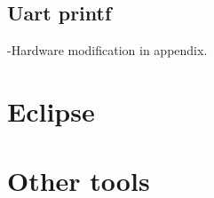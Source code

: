 \subsection{Uart printf}


-Hardware modification in appendix.


 

\section{Eclipse}


\section{Other tools}



